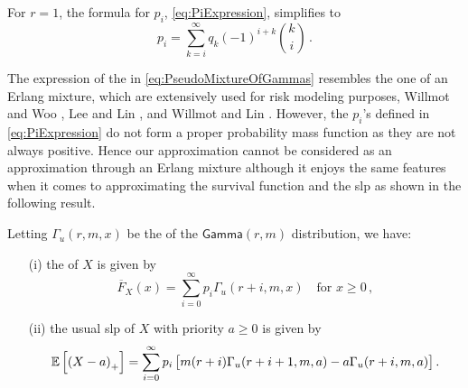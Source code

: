 \begin{remark}
For $r=1$, the formula for $p_i$, \eqref{eq:PiExpression}, simplifies to
\[ p_i = \sum_{k=i}^\infty q_k (-1)^{i+k} \binom{k}{i} \,. \]
\end{remark}

The expression of the \pdf in \eqref{eq:PseudoMixtureOfGammas} resembles the one of an Erlang mixture, which are extensively used for risk modeling purposes, \cf Willmot and Woo \cite{WiWo07}, Lee and Lin \cite{LeLi10}, and Willmot and Lin \cite{WiLi11}. However, the $p_i$'s defined in \eqref{eq:PiExpression} do not form a proper probability mass function as they are not always positive. Hence our approximation cannot be considered as an approximation through an Erlang mixture although it enjoys the same features when it comes to approximating the survival function and the slp as shown in the following result.
\begin{proposition} \label{prop:OrthogonalPolynomialForm}
Letting $\Gamma_u(r,m,x)$ be the \svf of the $\mathsf{Gamma}(r,m)$ distribution,  we have: 
\begin{itemize}
\item[(i)] the \svf of $X$ is given by
\begin{equation}\label{eq:TailFunctionX}
\overline{F}_{X}(x) = \sum_{i=0}^{\infty}p_i\Gamma_{u}(r+i,m,x) \quad \text{for } x \ge 0 \,,
\end{equation}
\item[(ii)] the usual slp of $X$ with priority $a \ge 0$ is given by
\begin{equation}
\mathbb E\left[\left(X-a\right)_{+}\right] = \sum_{i=0}^{\infty}p_i\left[m (r+i) \Gamma_{u}(r+i+1,m,a)-a\Gamma_{u}(r+i,m,a)\right]. \label{eq:UsualStoplossX}
\end{equation}
\end{itemize}
\end{proposition}
